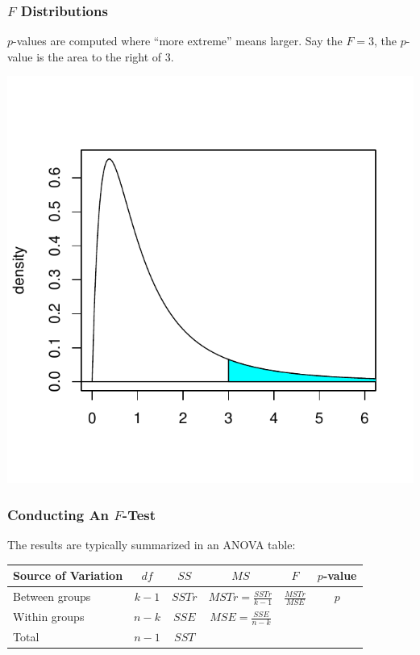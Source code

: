 \documentclass[handout]{beamer}
\newcommand{\blue}[1]{\textcolor{blue2}{#1}}
\begin{document}
\begin{frame}
\frametitle{$F$ Distributions}
$p$-values are computed where ``more extreme'' means \blue{larger}.  Say the $F=3$, the $p$-value is the \blue{area to the right of 3}. %
\begin{center}
\includegraphics{figure/lec22-010}
\end{center}
\end{frame}


\begin{frame}
\frametitle{Conducting An $F$-Test}
The results are typically summarized in an \blue{ANOVA table}:

\begin{small}
\begin{center}
\begin{tabular}{l|ccc|cc}
Source of Variation & $df$ & $SS$ & $MS$ & $F$ & $p$-value\\
\hline
Between groups & $k-1$ & $SSTr$ & $MSTr = \frac{SSTr}{k-1}$ & $\frac{MSTr}{MSE}$ & $p$\\
Within groups & $n-k$ & $SSE$ & $MSE = \frac{SSE}{n-k}$ & & \\
\hline
Total & $n-1$ & $SST$ &  & & 
\end{tabular}
\end{center}
\end{small}
\end{frame}
\end{document}
